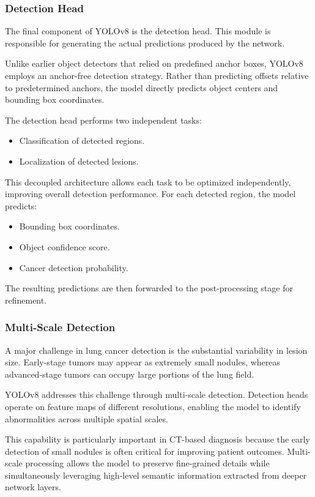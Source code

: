 \subsubsection{Detection Head}

The final component of YOLOv8 is the detection head. This module is responsible for generating the actual predictions produced by the network.

Unlike earlier object detectors that relied on predefined anchor boxes, YOLOv8 employs an anchor-free detection strategy. Rather than predicting offsets relative to predetermined anchors, the model directly predicts object centers and bounding box coordinates.

The detection head performs two independent tasks:

\begin{itemize}
	\item Classification of detected regions.
	\item Localization of detected lesions.
\end{itemize}

This decoupled architecture allows each task to be optimized independently, improving overall detection performance. For each detected region, the model predicts:

\begin{itemize}
	\item Bounding box coordinates.
	\item Object confidence score.
	\item Cancer detection probability.
\end{itemize}

The resulting predictions are then forwarded to the post-processing stage for refinement.

\subsubsection{Multi-Scale Detection}

A major challenge in lung cancer detection is the substantial variability in lesion size. Early-stage tumors may appear as extremely small nodules, whereas advanced-stage tumors can occupy large portions of the lung field.

YOLOv8 addresses this challenge through multi-scale detection. Detection heads operate on feature maps of different resolutions, enabling the model to identify abnormalities across multiple spatial scales.

This capability is particularly important in CT-based diagnosis because the early detection of small nodules is often critical for improving patient outcomes. Multi-scale processing allows the model to preserve fine-grained details while simultaneously leveraging high-level semantic information extracted from deeper network layers.

